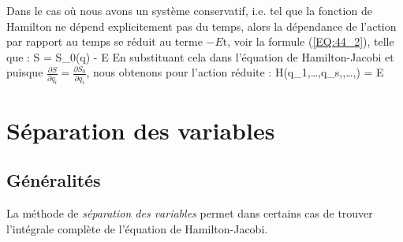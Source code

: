 Dans le cas o\`{u} nous avons un syst\`{e}me conservatif, i.e. tel que la fonction de Hamilton ne d\'{e}pend explicitement pas du temps, alors la d\'{e}pendance de l'action par rapport au temps se r\'{e}duit au terme $-E\mathrm{t}$, voir la formule (\ref{EQ:44_2}), telle que :
\be
	S = S_{0}(q) - E \label{EQ:47_5}
\ee
En substituant cela dans l'\'{e}quation de Hamilton-Jacobi et puisque $\frac{\partial S}{\partial q_{i}} = \frac{\partial S_{0}}{\partial q_{i}}$, nous obtenons pour l'action r\'{e}duite :
\be
	H\left(q_{1},\ldots,q_{s},,\ldots,\right) = E \label{EQ:47_6}
\ee

\section{S\'{e}paration des variables}\label{PAR:48}

\subsection{G\'{e}n\'{e}ralit\'{e}s}\label{PAR:48_1}

La m\'{e}thode de \emph{s\'{e}paration des variables} permet dans certains cas de trouver l'int\'{e}grale compl\`{e}te de l'\'{e}quation de Hamilton-Jacobi.

